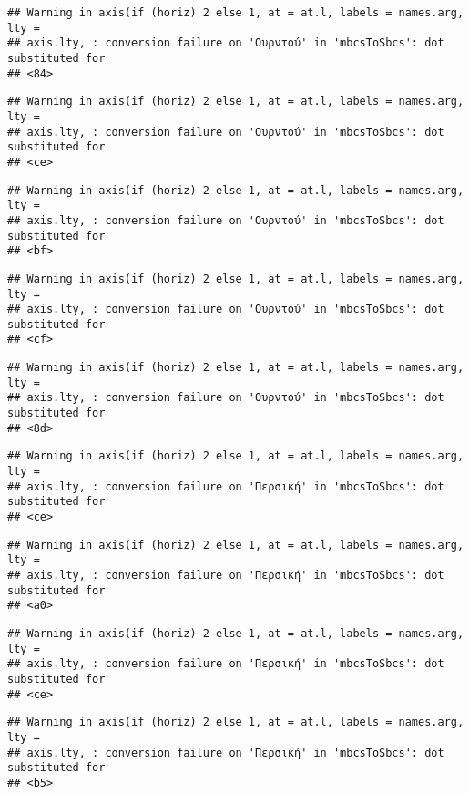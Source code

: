 \documentclass[
]{article}
\begin{document}
\begin{verbatim}
## Warning in axis(if (horiz) 2 else 1, at = at.l, labels = names.arg, lty =
## axis.lty, : conversion failure on 'Ουρντού' in 'mbcsToSbcs': dot substituted for
## <84>
\end{verbatim}

\begin{verbatim}
## Warning in axis(if (horiz) 2 else 1, at = at.l, labels = names.arg, lty =
## axis.lty, : conversion failure on 'Ουρντού' in 'mbcsToSbcs': dot substituted for
## <ce>
\end{verbatim}

\begin{verbatim}
## Warning in axis(if (horiz) 2 else 1, at = at.l, labels = names.arg, lty =
## axis.lty, : conversion failure on 'Ουρντού' in 'mbcsToSbcs': dot substituted for
## <bf>
\end{verbatim}

\begin{verbatim}
## Warning in axis(if (horiz) 2 else 1, at = at.l, labels = names.arg, lty =
## axis.lty, : conversion failure on 'Ουρντού' in 'mbcsToSbcs': dot substituted for
## <cf>
\end{verbatim}

\begin{verbatim}
## Warning in axis(if (horiz) 2 else 1, at = at.l, labels = names.arg, lty =
## axis.lty, : conversion failure on 'Ουρντού' in 'mbcsToSbcs': dot substituted for
## <8d>
\end{verbatim}

\begin{verbatim}
## Warning in axis(if (horiz) 2 else 1, at = at.l, labels = names.arg, lty =
## axis.lty, : conversion failure on 'Περσική' in 'mbcsToSbcs': dot substituted for
## <ce>
\end{verbatim}

\begin{verbatim}
## Warning in axis(if (horiz) 2 else 1, at = at.l, labels = names.arg, lty =
## axis.lty, : conversion failure on 'Περσική' in 'mbcsToSbcs': dot substituted for
## <a0>
\end{verbatim}

\begin{verbatim}
## Warning in axis(if (horiz) 2 else 1, at = at.l, labels = names.arg, lty =
## axis.lty, : conversion failure on 'Περσική' in 'mbcsToSbcs': dot substituted for
## <ce>
\end{verbatim}

\begin{verbatim}
## Warning in axis(if (horiz) 2 else 1, at = at.l, labels = names.arg, lty =
## axis.lty, : conversion failure on 'Περσική' in 'mbcsToSbcs': dot substituted for
## <b5>
\end{verbatim}
\end{document}
